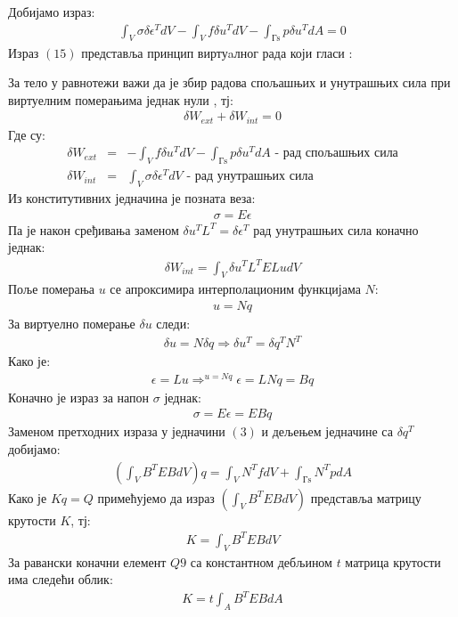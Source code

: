 \documentclass[11pt, a4paper]{article}
\begin{document}
Добијамо израз:
\begin{align}
\int_V \sigma \delta \epsilon^T dV - \int_V f \delta u^T dV - \int_{\text{Гs}} p \delta u^T dA = 0 \label{Equ:A}
\end{align}
Израз $(15)$ представља принцип виртуaлног рада који гласи : 
\par
За тело у равнотежи важи да је збир радова спољашњих и унутрашњих сила при виртуелним померањима једнак нули \cite{mnd1}, тј:
\begin{align}
\delta W_{ext} + \delta W_{int} = 0
\end{align}
Где су:
\begin{eqnarray*}
\delta W_{ext} &=& - \int_V f \delta u^T dV - \int_{\text{Гs}} p \delta u^T dA \text{ - рад спољашњих сила}\\
\delta W_{int} &=& \int_V \sigma \delta \epsilon^T dV \text{ - рад унутрашњих сила}
\end{eqnarray*}
Из конститутивних једначина је позната веза:
\begin{eqnarray}
\sigma = E \epsilon
\end{eqnarray}
Па је након сређивања заменом $\delta u^T L^T = \delta \epsilon^T$ рад унутрашњих сила коначно једнак:
\begin{eqnarray}
\delta W_{int} = \int_V \delta u^T L^T E L u dV 
\end{eqnarray}
Поље померања $u$ се апроксимира интерполационим функцијама $N$:
\begin{eqnarray}
u = Nq
\end{eqnarray}
За виртуелно померање $\delta u$ следи:
\begin{eqnarray}
\delta u = N \delta q \Rightarrow \delta u^T=  \delta q^T N^T
\end{eqnarray}
Како је:
\begin{eqnarray}
\epsilon = Lu \Rightarrow ^{u = Nq} \epsilon = LNq = Bq
\end{eqnarray}
Коначно је израз за напон $\sigma$ једнак:
\begin{eqnarray}
\sigma = E \epsilon = E B q
\end{eqnarray}
Заменом претходних израза у једначини $(3)$ и дељењем једначине са $ \delta q^T$ добијамо:
\begin{eqnarray}
\left( \int_V B^T E B dV \right) q = \int_V N^T f dV + \int_{\text{Гs}} N^T p  dA
\end{eqnarray}
Како је $Kq = Q$ примећујемо да израз $\left( \int_V B^T E B dV \right) $ представља матрицу крутости $K$, тј:
\begin{eqnarray}
K = \int_V B^T E B dV
\end{eqnarray}
За равански коначни елемент $Q9$ са константном дебљином $t$ матрица крутости има следећи облик:
\begin{align}
K = t\int_A B^T E B dA 
\end{align}
\end{document}
